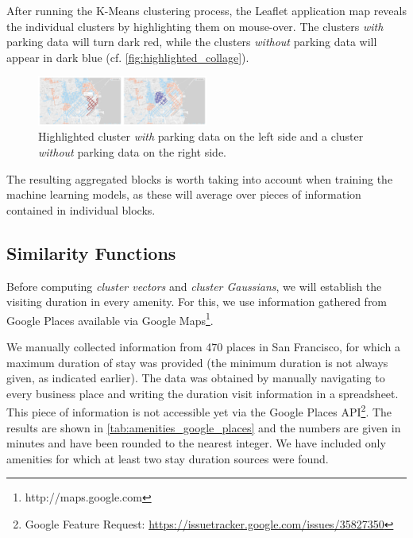 After running the K-Means clustering process, the Leaflet application map reveals the individual clusters by highlighting them on mouse-over.
The clusters \textit{with} parking data will turn dark red, while the clusters \textit{without} parking data will appear in dark blue (cf. \autoref{fig:highlighted_collage}). 

\begin{figure}[!ht]
	\centering
	\includegraphics[width=0.5\textwidth]{graphics/highlighted_collage.png}
	\caption{Highlighted cluster \textit{with} parking data on the left side and a cluster \textit{without} parking data on the right side.}
	\label{fig:highlighted_collage}
\end{figure}

The resulting aggregated blocks is worth taking into account when training the machine learning models, as these will average over pieces of information contained in individual blocks. 

\subsection{Similarity Functions}
\label{evaluation:urban_measure}
Before computing \textit{cluster vectors} and \textit{cluster Gaussians}, we will establish the visiting duration in every amenity.
For this, we use information gathered from Google Places available via Google Maps\footnote{http://maps.google.com}.

We manually collected information from 470 places in San Francisco, for which a maximum duration of stay was provided (the minimum duration is not always given, as indicated earlier).
The data was obtained by manually navigating to every business place and writing the duration visit information in a spreadsheet.
This piece of information is not accessible yet via the Google Places API\footnote{Google Feature Request: \url{https://issuetracker.google.com/issues/35827350}}.
The results are shown in \autoref{tab:amenities_google_places} and the numbers are given in minutes and have been rounded to the nearest integer. We have included only amenities for which at least two stay duration sources were found. 

